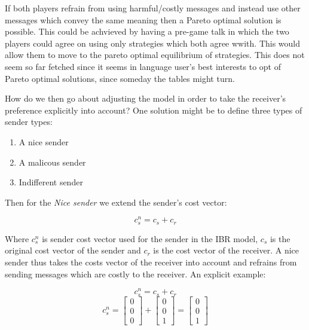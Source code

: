 \documentclass{article}
\begin{document}
If both players refrain from using harmful/costly messages and instead use other messages which convey the same meaning then a Pareto optimal solution is possible. This could be achvieved by having a pre-game talk in which the two players could agree on using only strategies which both agree wwith. This would allow them to move to the pareto optimal equilibrium of strategies. This does not seem so far fetched since it seems in language user's best interests to opt of Pareto optimal solutions, since someday the tables might turn.

How do we then go about adjusting the model in order to take the receiver's preference explicitly into account? One solution might be to define three types of sender types: \\

\begin{enumerate}
\item A nice sender
\item A malicous sender
\item Indifferent sender
\end{enumerate}

Then for the \textit{Nice sender} we extend the sender's cost vector:

\begin{equation*}
c_s^n= c_s + c_r
\end{equation*}

Where $c_s^n$ is sender cost vector used for the sender in the IBR model, $c_s$ is the original cost vector of the sender and $c_r$ is the cost vector of the receiver. A nice sender thus takes the costs vector of the receiver into account and refrains from sending messages which are costly to the receiver. An explicit example:

\begin{equation*}
c_s^n= c_s + c_r
\end{equation*}
\begin{equation*}
c_s^n=
\begin{bmatrix}
0 \\
0 \\
0
\end{bmatrix}
+
\begin{bmatrix}
0 \\
0 \\
1
\end{bmatrix}
=
\begin{bmatrix}
0 \\
0 \\
1
\end{bmatrix}
\end{equation*}
\end{document}
